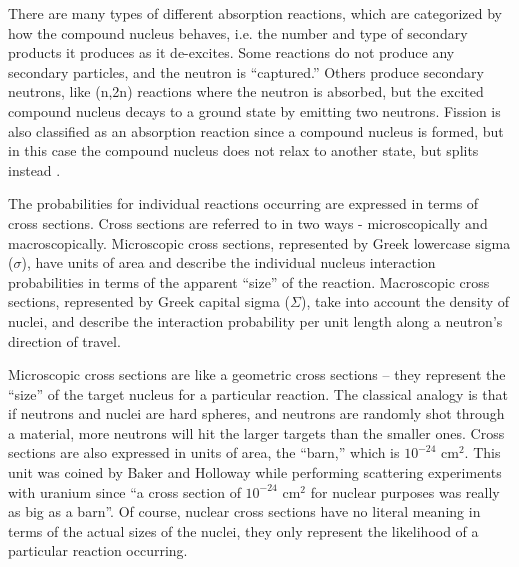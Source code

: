There are many types of different absorption reactions, which are categorized by how the compound nucleus behaves, i.e. the number and type of secondary products it produces as it de-excites.  Some reactions do not produce any secondary particles, and the neutron is ``captured.''  Others produce secondary neutrons, like (n,2n) reactions where the neutron is absorbed, but the excited compound nucleus decays to a ground state by emitting two neutrons.  Fission is also classified as an absorption reaction since a compound nucleus is formed, but in this case the compound nucleus does not relax to another state, but splits instead \cite{duderstadt}. 

The probabilities for individual reactions occurring are expressed in terms of cross sections.  Cross sections are referred to in two ways - microscopically and macroscopically.  Microscopic cross sections, represented by Greek lowercase sigma ($\sigma$), have units of area and describe the individual nucleus interaction probabilities in terms of the apparent ``size'' of the reaction.  Macroscopic cross sections, represented by Greek capital sigma ($\Sigma$), take into account the density of nuclei, and describe the interaction probability per unit length along a neutron's direction of travel.  

Microscopic cross sections are like a geometric cross sections -- they represent the ``size'' of the target nucleus for a particular reaction.  The classical analogy is that if neutrons and nuclei are hard spheres, and neutrons are randomly shot through a material, more neutrons will hit the larger targets than the smaller ones.  Cross sections are also expressed in units of area, the ``barn,'' which is $10^{-24}$ cm$^2$.  This unit was coined by Baker and Holloway while performing scattering experiments with uranium since ``a cross section of $10^{-24}$ cm$^2$ for nuclear purposes was really as big as a barn''\cite{LAMS523}.  Of course, nuclear cross sections have no literal meaning in terms of the actual sizes of the nuclei, they only represent the likelihood of a particular reaction occurring.  

